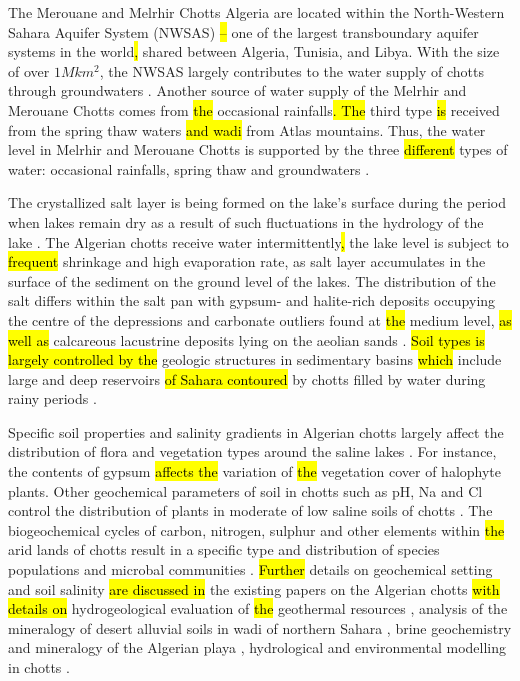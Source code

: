 \documentclass[asi,article,submit,pdftex,moreauthors]{Definitions/mdpi}
\begin{document}
The Merouane and Melrhir Chotts Algeria are located within the North-Western Sahara Aquifer System (NWSAS) \hl{-- }one of the largest transboundary aquifer systems in the world\hl{, }shared between Algeria, Tunisia, and Libya. With the size of over $1 M km^2$, the NWSAS largely contributes to the water supply of\hl{ }chotts through\hl{ }groundwaters \cite{HAKIMI2021100791}. Another source of water supply of the Melrhir and Merouane Chotts comes from \hl{the }occasional rainfalls\hl{. The} third type \hl{is} received from the spring thaw waters \hl{and wadi }from Atlas mountains. Thus, the water level in Melrhir and Merouane Chotts is supported by the three \hl{different} types of water: occasional rainfalls, spring thaw and groundwaters \cite{Ballais,fabre2005geologie,aubert1983observations}. 

The crystallized salt layer is being formed on the lake's surface during the period when\hl{ }lakes remain dry as a result of such fluctuations in the hydrology of the lake \cite{Remli}. The Algerian chotts receive water intermittently\hl{, }the lake level is subject to \hl{frequent} shrinkage and\hl{ }high evaporation rate, as salt layer accumulates in the surface of the sediment on the ground level of the lakes. The distribution of the salt differs within the salt pan with gypsum- and halite-rich deposits occupying the centre of the depressions and carbonate outliers found at \hl{the} medium level, \hl{as well as} calcareous lacustrine deposits lying on the aeolian sands \cite{GASSE19871}. \hl{Soil types is largely controlled by the }geologic structures in sedimentary basins \hl{which }include large and deep reservoirs\hl{ of Sahara contoured} by chotts\hl{ }filled by water during\hl{ }rainy periods \cite{HAMICHE2015261}. 

Specific soil properties and salinity gradients in Algerian chotts largely affect the distribution of\hl{ }flora and vegetation types around the saline lakes \cite{Neffar}. For instance, the contents of gypsum \hl{affects the }variation of \hl{the }vegetation cover of halophyte plants. Other geochemical parameters of soil in chotts such as pH, Na and Cl control the distribution of plants in moderate of low saline soils of chotts \cite{CHENCHOUNI2017660}. The biogeochemical cycles of carbon, nitrogen, sulphur and other elements within \hl{the }arid lands of chotts result\hl{ }in a specific type\hl{ }and distribution of\hl{ }species populations and microbal communities \cite{BOUTAIBA2011909,QUADRI2016119}. \hl{Further} details on geochemical setting and soil salinity \hl{are discussed in }the existing papers on the Algerian chotts\hl{ }\cite{Abdennour} \hl{with details on} hydrogeological evaluation of \hl{the }geothermal resources \cite{BENMARCE2021104285,MELOUAH2021102211,Abdelaziz}, analysis of the mineralogy of desert alluvial soils in wadi of northern Sahara \cite{Djili}, brine geochemistry and mineralogy of the Algerian playa \cite{HamdiAissa,Valles}, hydrological and environmental modelling in chotts \cite{Samie}.
\end{document}
